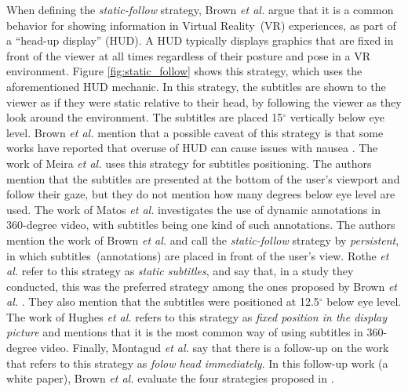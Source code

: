 When defining the \emph{static-follow} strategy, Brown \emph{et al.} \cite{brown_subtitles_2017} argue that it is a common behavior for showing information in Virtual Reality~(VR) experiences, as part of a ``head-up display'' (HUD). A HUD typically displays graphics that are fixed in front of the viewer at all times regardless of their posture and pose in a VR environment. Figure \ref{fig:static_follow} shows this strategy, which uses the aforementioned HUD mechanic. In this strategy, the subtitles are shown to the viewer as if they were static relative to their head, by following the viewer as they look around the environment. The subtitles are placed 15$^{\circ}$ vertically below eye level. Brown \emph{et al.} \cite{brown_subtitles_2017} mention that a possible caveat of this strategy is that some works have reported that overuse of HUD can cause issues with nausea \cite{laviola2000discussion, sharples2008virtual}.
The work of Meira \emph{et al.} \cite{meira_video_2016} uses this strategy for subtitles positioning. The authors mention that the subtitles are presented at the bottom of the user's viewport and follow their gaze, but they do not mention how many degrees below eye level are used. The work of Matos \emph{et al.} \cite{matos_dynamic_2018} investigates the use of dynamic annotations in 360-degree video, with subtitles being one kind of such annotations. The authors mention the work of Brown \emph{et al.} \cite{brown_subtitles_2017} and call the \emph{static-follow} strategy by \emph{persistent}, in which subtitles~(annotations) are placed in front of the user's view. Rothe \emph{et al.} \cite{rothe_dynamic_2018} refer to this strategy as \emph{static subtitles}, and say that, in a study they conducted, this was the preferred strategy among the ones proposed by Brown \emph{et al.} \cite{brown_subtitles_2017}. They also mention that the subtitles were positioned at 12.5$^{\circ}$ below eye level. The work of Hughes \emph{et al.} \cite{hughes_disruptive_2019} refers to this strategy as \emph{fixed position in the display picture} and mentions that it is the most common way of using subtitles in 360-degree video. Finally, Montagud \emph{et al.} \cite{montagud_culture_2020} say that there is a follow-up on the work \cite{brown_subtitles_2017} that refers to this strategy as \emph{folow head immediately}. In this follow-up work (a white paper), Brown \emph{et al.} \cite{brown2018exploring} evaluate the four strategies proposed in \cite{brown_subtitles_2017}. 

